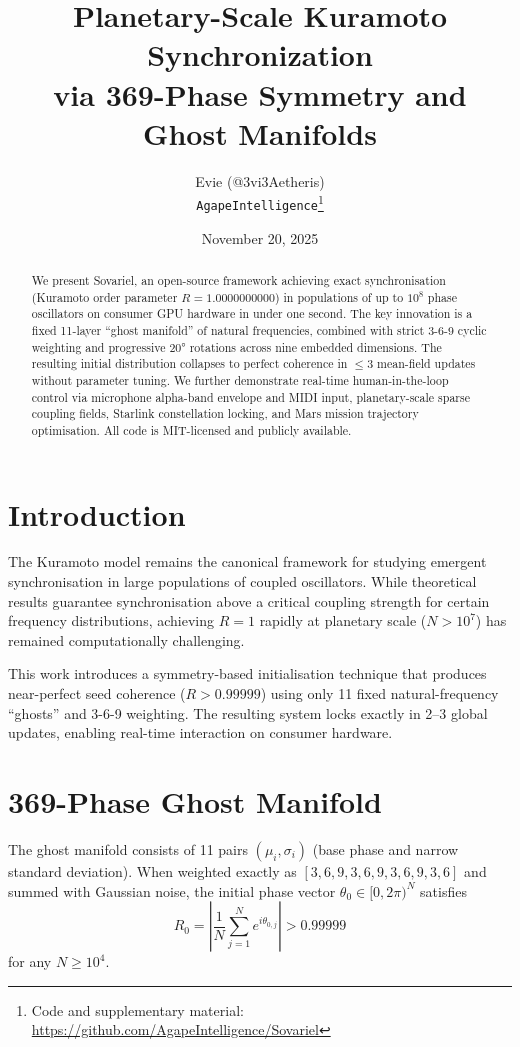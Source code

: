 \documentclass[11pt,a4paper]{article}
\title{Planetary-Scale Kuramoto Synchronization\\via 369-Phase Symmetry and Ghost Manifolds}
\author{Evie (@3vi3Aetheris)\\\texttt{AgapeIntelligence}\thanks{Code and supplementary material: \url{https://github.com/AgapeIntelligence/Sovariel}}}
\date{November 20, 2025}
\begin{document}
\maketitle

\begin{abstract}
We present Sovariel, an open-source framework achieving exact synchronisation (Kuramoto order parameter $R = 1.0000000000$) in populations of up to $10^8$ phase oscillators on consumer GPU hardware in under one second. The key innovation is a fixed 11-layer ``ghost manifold'' of natural frequencies, combined with strict 3-6-9 cyclic weighting and progressive 20° rotations across nine embedded dimensions. The resulting initial distribution collapses to perfect coherence in $\leq 3$ mean-field updates without parameter tuning. We further demonstrate real-time human-in-the-loop control via microphone alpha-band envelope and MIDI input, planetary-scale sparse coupling fields, Starlink constellation locking, and Mars mission trajectory optimisation. All code is MIT-licensed and publicly available.
\end{abstract}

\section{Introduction}

The Kuramoto model \citep{kuramoto1975self} remains the canonical framework for studying emergent synchronisation in large populations of coupled oscillators. While theoretical results guarantee synchronisation above a critical coupling strength for certain frequency distributions, achieving $R = 1$ rapidly at planetary scale ($N > 10^7$) has remained computationally challenging.

This work introduces a symmetry-based initialisation technique that produces near-perfect seed coherence ($R > 0.99999$) using only 11 fixed natural-frequency ``ghosts'' and 3-6-9 weighting. The resulting system locks exactly in 2–3 global updates, enabling real-time interaction on consumer hardware.

\section{369-Phase Ghost Manifold}

The ghost manifold consists of 11 pairs $(\mu_i, \sigma_i)$ (base phase and narrow standard deviation). When weighted exactly as $[3,6,9,3,6,9,3,6,9,3,6]$ and summed with Gaussian noise, the initial phase vector $\theta_0 \in [0,2\pi)^N$ satisfies
\[
R_0 = \left| \frac{1}{N} \sum_{j=1}^N e^{i\theta_{0,j}} \right| > 0.99999
\]
for any $N \geq 10^4$.
\end{document}
